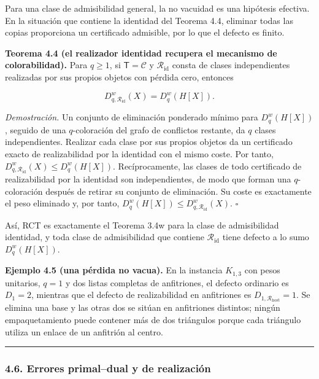 \documentclass[spanish,11pt,a4paper]{article}
\begin{document}
Para una clase de admisibilidad general, la no vacuidad es una hipótesis
efectiva. En la situación que contiene la identidad del Teorema 4.4,
eliminar todas las copias proporciona un certificado admisible, por lo
que el defecto es finito.

\textbf{Teorema 4.4 (el realizador identidad recupera el mecanismo de
colorabilidad).} Para \(q\ge1\), si \(\mathsf T=\mathcal C\) y
\(\mathcal R_{\mathrm{id}}\) consta de clases independientes realizadas
por sus propios objetos con pérdida cero, entonces

\[
D^w_{q,\mathcal R_{\mathrm{id}}}(X)=D_q^w(H[X]).
\]

\emph{Demostración.} Un conjunto de eliminación ponderado mínimo para
\(D_q^w(H[X])\), seguido de una \(q\)-coloración del grafo de conflictos
restante, da \(q\) clases independientes. Realizar cada clase por sus
propios objetos da un certificado exacto de realizabilidad por la
identidad con el mismo coste. Por tanto,
\(D^w_{q,\mathcal R_{\mathrm{id}}}(X)\le D_q^w(H[X])\). Recíprocamente,
las clases de todo certificado de realizabilidad por la identidad son
independientes, de modo que forman una \(q\)-coloración después de
retirar su conjunto de eliminación. Su coste es exactamente el peso
eliminado y, por tanto,
\(D_q^w(H[X])\le D^w_{q,\mathcal R_{\mathrm{id}}}(X)\). \(\square\)

Así, RCT es exactamente el Teorema 3.4w para la clase de admisibilidad
identidad, y toda clase de admisibilidad que contiene
\(\mathcal R_{\mathrm{id}}\) tiene defecto a lo sumo \(D_q^w(H[X])\).

\textbf{Ejemplo 4.5 (una pérdida no vacua).} En la instancia \(K_{1,3}\)
con pesos unitarios, \(q=1\) y dos listas completas de anfitriones, el
defecto ordinario es \(D_1=2\), mientras que el defecto de
realizabilidad en anfitriones es \(D_{1,\mathcal R_{\mathrm{host}}}=1\).
Se elimina una base y las otras dos se sitúan en anfitriones distintos;
ningún empaquetamiento puede contener más de dos triángulos porque cada
triángulo utiliza un enlace de un anfitrión al centro.

\begin{center}\rule{0.5\linewidth}{0.5pt}\end{center}

\subsubsection{4.6. Errores primal--dual y de
realización}\label{errores-primaldual-y-de-realizaciuxf3n}
\end{document}
